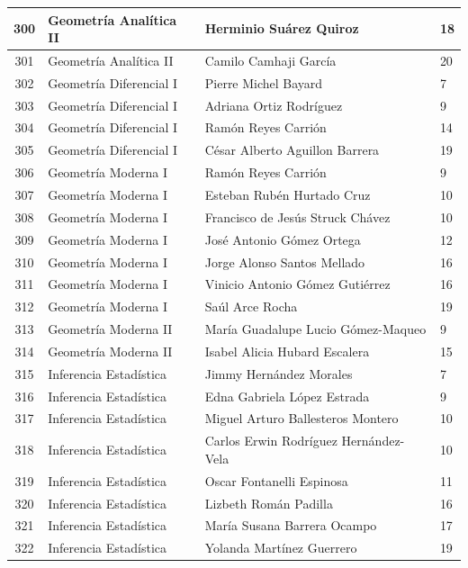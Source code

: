 {\begin{longtable}{|c|p{6.5cm}|p{5cm}|p{1.5cm}|}
  300 & Geometría Analítica II & Herminio Suárez Quiroz & 18 \\ \hline 
  301 & Geometría Analítica II & Camilo Camhaji García & 20 \\ \hline 
  302 & Geometría Diferencial I & Pierre Michel Bayard & 7 \\ \hline 
  303 & Geometría Diferencial I & Adriana Ortiz Rodríguez & 9 \\ \hline 
  304 & Geometría Diferencial I & Ramón Reyes Carrión & 14 \\ \hline 
  305 & Geometría Diferencial I & César Alberto Aguillon Barrera & 19 \\ \hline 
  306 & Geometría Moderna I & Ramón Reyes Carrión & 9 \\ \hline 
  307 & Geometría Moderna I & Esteban Rubén Hurtado Cruz & 10 \\ \hline 
  308 & Geometría Moderna I & Francisco de Jesús Struck Chávez & 10 \\ \hline 
  309 & Geometría Moderna I & José Antonio Gómez Ortega & 12 \\ \hline 
  310 & Geometría Moderna I & Jorge Alonso Santos Mellado & 16 \\ \hline 
  311 & Geometría Moderna I & Vinicio Antonio Gómez Gutiérrez & 16 \\ \hline 
  312 & Geometría Moderna I & Saúl Arce Rocha & 19 \\ \hline 
  313 & Geometría Moderna II & María Guadalupe Lucio Gómez-Maqueo & 9 \\ \hline 
  314 & Geometría Moderna II & Isabel Alicia Hubard Escalera & 15 \\ \hline 
  315 & Inferencia Estadística & Jimmy Hernández Morales & 7 \\ \hline 
  316 & Inferencia Estadística & Edna Gabriela López Estrada & 9 \\ \hline 
  317 & Inferencia Estadística & Miguel Arturo Ballesteros Montero & 10 \\ \hline 
  318 & Inferencia Estadística & Carlos Erwin Rodríguez Hernández-Vela & 10 \\ \hline 
  319 & Inferencia Estadística & Oscar Fontanelli Espinosa & 11 \\ \hline 
  320 & Inferencia Estadística & Lizbeth Román Padilla & 16 \\ \hline 
  321 & Inferencia Estadística & María Susana Barrera Ocampo & 17 \\ \hline 
  322 & Inferencia Estadística & Yolanda Martínez Guerrero & 19 \\ \hline 

\end{longtable}}
